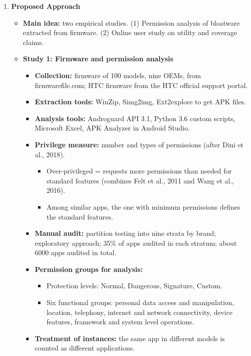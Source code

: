\documentclass[11pt,a4paper]{article}
\newcommand{\entrypart}[1]{\textbf{\color{accent}#1}\par\vspace{2pt}}
\begin{document}
\begin{enumerate}
    \item \entrypart{Proposed Approach}
    \begin{itemize}[leftmargin=*, itemsep=1pt, topsep=2pt]
        \item \textbf{Main idea:} two empirical studies. (1) Permission analysis of bloatware extracted from firmware. (2) Online user study on utility and coverage claims.
        \item \textbf{Study 1: Firmware and permission analysis}
        \begin{itemize}[itemsep=0pt]
            \item \textbf{Collection:} firmware of 100 models, nine OEMs, from firmwarefile.com; HTC firmware from the HTC official support portal.
            \item \textbf{Extraction tools:} WinZip, Simg2img, Ext2explore to get APK files.
            \item \textbf{Analysis tools:} Androguard API 3.1, Python 3.6 custom scripts, Microsoft Excel, APK Analyzer in Android Studio.
            \item \textbf{Privilege measure:} number and types of permissions (after Dini et al., 2018).
            \begin{itemize}[itemsep=0pt]
                \item Over-privileged = requests more permissions than needed for standard features (combines Felt et al., 2011 and Wang et al., 2016).
                \item Among similar apps, the one with minimum permissions defines the standard features.
            \end{itemize}
            \item \textbf{Manual audit:} partition testing into nine strata by brand; exploratory approach; 35\% of apps audited in each stratum; about 6000 apps audited in total.
            \item \textbf{Permission groups for analysis:}
            \begin{itemize}[itemsep=0pt]
                \item Protection levels: Normal, Dangerous, Signature, Custom.
                \item Six functional groups: personal data access and manipulation, location, telephony, internet and network connectivity, device features, framework and system level operations.
            \end{itemize}
            \item \textbf{Treatment of instances:} the same app in different models is counted as different applications.

\end{itemize}
\end{itemize}
\end{enumerate}
\end{document}
